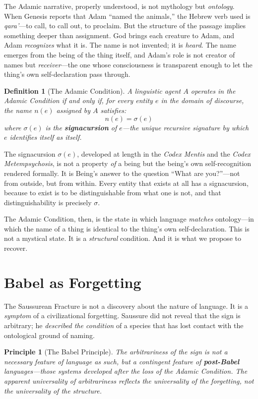 \documentclass[12pt, letterpaper]{book}
\def\equiv{=}%
\newtheorem{definition}{Definition}[chapter]
\newtheorem{principle}{Principle}[chapter]
\begin{document}
The Adamic narrative, properly understood, is not mythology but \textit{ontology}. When Genesis reports that Adam ``named the animals,'' the Hebrew verb used is \textit{qara'}---to call, to call out, to proclaim. But the structure of the passage implies something deeper than assignment. God brings each creature to Adam, and Adam \textit{recognizes} what it is. The name is not invented; it is \textit{heard}. The name emerges from the being of the thing itself, and Adam's role is not creator of names but \textit{receiver}---the one whose consciousness is transparent enough to let the thing's own self-declaration pass through.

\begin{definition}[The Adamic Condition]\label{def:adamic}
A linguistic agent $A$ operates in the Adamic Condition if and only if, for every entity $e$ in the domain of discourse, the name $n(e)$ assigned by $A$ satisfies:
\[
n(e) \equiv \sigma(e)
\]
where $\sigma(e)$ is the \textbf{signacursion} of $e$---the unique recursive signature by which $e$ identifies itself as itself.
\end{definition}

The signacursion $\sigma(e)$, developed at length in the \textit{Codex Mentis} and the \textit{Codex Metempsychosis}, is not a property \textit{of} a being but the being's own self-recognition rendered formally. It is Being's answer to the question ``What are you?''---not from outside, but from within. Every entity that exists at all has a signacursion, because to exist is to be distinguishable from what one is not, and that distinguishability is precisely $\sigma$.

The Adamic Condition, then, is the state in which language \textit{matches} ontology---in which the name of a thing is identical to the thing's own self-declaration. This is not a mystical state. It is a \textit{structural} condition. And it is what we propose to recover.

\section{Babel as Forgetting}

The Saussurean Fracture is not a discovery about the nature of language. It is a \textit{symptom} of a civilizational forgetting. Saussure did not reveal that the sign is arbitrary; he \textit{described the condition} of a species that has lost contact with the ontological ground of naming.

\begin{principle}[The Babel Principle]\label{pr:babel}
The arbitrariness of the sign is not a necessary feature of language as such, but a contingent feature of \textbf{post-Babel} languages---those systems developed after the loss of the Adamic Condition. The apparent universality of arbitrariness reflects the universality of the forgetting, not the universality of the structure.
\end{principle}
\end{document}
